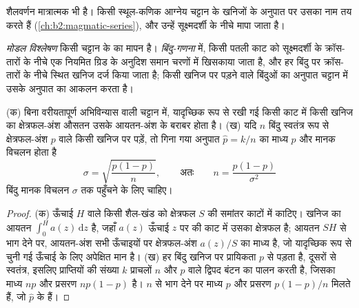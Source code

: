 शैलवर्णन मात्रात्मक भी है। किसी स्थूल-कणिक आग्नेय चट्टान के खनिजों के अनुपात
 पर उसका नाम तय करते हैं (\cref{ch:b2:magmatic-series}), और उन्हें
सूक्ष्मदर्शी के नीचे मापा जाता है।

\begin{definition}[मोडल विश्लेषण, बिंदु-गणना]\label{def:b2:field-lab-methods-2:modal}
\emph{मोडल विश्लेषण} किसी चट्टान के  का
मापन है। \emph{बिंदु-गणना} में, किसी पतली
काट को सूक्ष्मदर्शी के क्रॉस-तारों के नीचे एक नियमित ग्रिड के अनुदिश समान चरणों में खिसकाया जाता है, और
हर बिंदु पर क्रॉस-तारों के नीचे स्थित खनिज दर्ज किया जाता है; किसी खनिज पर पड़ने वाले बिंदुओं का
अनुपात चट्टान में उसके अनुपात का आकलन करता है।
\end{definition}

\begin{proposition}\label{prop:b2:field-lab-methods-2:counting}
(क) बिना वरीयतापूर्ण अभिविन्यास वाली चट्टान में, यादृच्छिक रूप से रखी गई किसी काट में किसी खनिज का
क्षेत्रफल-अंश औसतन उसके आयतन-अंश के बराबर होता है। (ख) यदि $n$ बिंदु स्वतंत्र रूप से
क्षेत्रफल-अंश $p$ वाले किसी खनिज पर पड़ें, तो गिना गया अनुपात $\hat p = k/n$ का माध्य $p$ और मानक
विचलन होता है
\begin{equation}
\sigma = \sqrt{\frac{p(1-p)}{n}} , \qquad\text{अतः}\qquad n = \frac{p(1-p)}{\sigma^2}
\label{eq:b2:field-lab-methods-2:binomial}
\end{equation}
बिंदु मानक विचलन $\sigma$ तक पहुँचने के लिए चाहिए।
\end{proposition}

\begin{proof}
(क) ऊँचाई $H$ वाले किसी शैल-खंड को क्षेत्रफल $S$ की समांतर काटों में काटिए। खनिज का
आयतन $\int_0^H a(z)\,\mathrm{d}z$ है, जहाँ $a(z)$ ऊँचाई $z$ पर की काट में उसका क्षेत्रफल है;
आयतन $SH$ से भाग देने पर, आयतन-अंश सभी ऊँचाइयों पर क्षेत्रफल-अंश $a(z)/S$ का माध्य है,
जो यादृच्छिक रूप से चुनी गई ऊँचाई के लिए अपेक्षित मान है। (ख) हर बिंदु खनिज पर
प्रायिकता $p$ से पड़ता है, दूसरों से स्वतंत्र, इसलिए प्राप्तियों की संख्या $k$ प्राचलों $n$ और $p$ वाले
द्विपद बंटन का पालन करती है, जिसका माध्य $np$ और प्रसरण $np(1-p)$ है। $n$ से भाग देने पर
माध्य $p$ और प्रसरण $p(1-p)/n$ मिलते हैं, जो $\hat p$ के हैं।
\end{proof}

